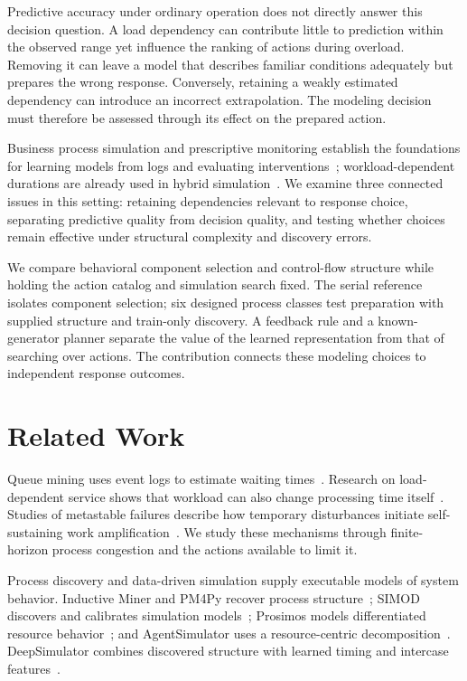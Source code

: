 Predictive accuracy under ordinary operation does not directly answer this decision question. A load dependency can contribute little to prediction within the observed range yet influence the ranking of actions during overload. Removing it can leave a model that describes familiar conditions adequately but prepares the wrong response. Conversely, retaining a weakly estimated dependency can introduce an incorrect extrapolation. The modeling decision must therefore be assessed through its effect on the prepared action.

Business process simulation and prescriptive monitoring establish the foundations for learning models from logs and evaluating interventions~\cite{simod,alarms,hybridpolicy,rlpolicies}; workload-dependent durations are already used in hybrid simulation~\cite{deepsimulator,hybridpolicy}. We examine three connected issues in this setting: retaining dependencies relevant to response choice, separating predictive quality from decision quality, and testing whether choices remain effective under structural complexity and discovery errors.

We compare behavioral component selection and control-flow structure while holding the action catalog and simulation search fixed. The serial reference isolates component selection; six designed process classes test preparation with supplied structure and train-only discovery. A feedback rule and a known-generator planner separate the value of the learned representation from that of searching over actions. The contribution connects these modeling choices to independent response outcomes.

\section{Related Work}
Queue mining uses event logs to estimate waiting times~\cite{queue}. Research on load-dependent service shows that workload can also change processing time itself~\cite{load}. Studies of metastable failures describe how temporary disturbances initiate self-sustaining work amplification~\cite{metastable}. We study these mechanisms through finite-horizon process congestion and the actions available to limit it.

Process discovery and data-driven simulation supply executable models of system behavior. Inductive Miner and PM4Py recover process structure~\cite{inductive,pm4py}; SIMOD discovers and calibrates simulation models~\cite{simod}; Prosimos models differentiated resource behavior~\cite{prosimos}; and AgentSimulator uses a resource-centric decomposition~\cite{agents}. DeepSimulator combines discovered structure with learned timing and intercase features~\cite{deepsimulator}. 

